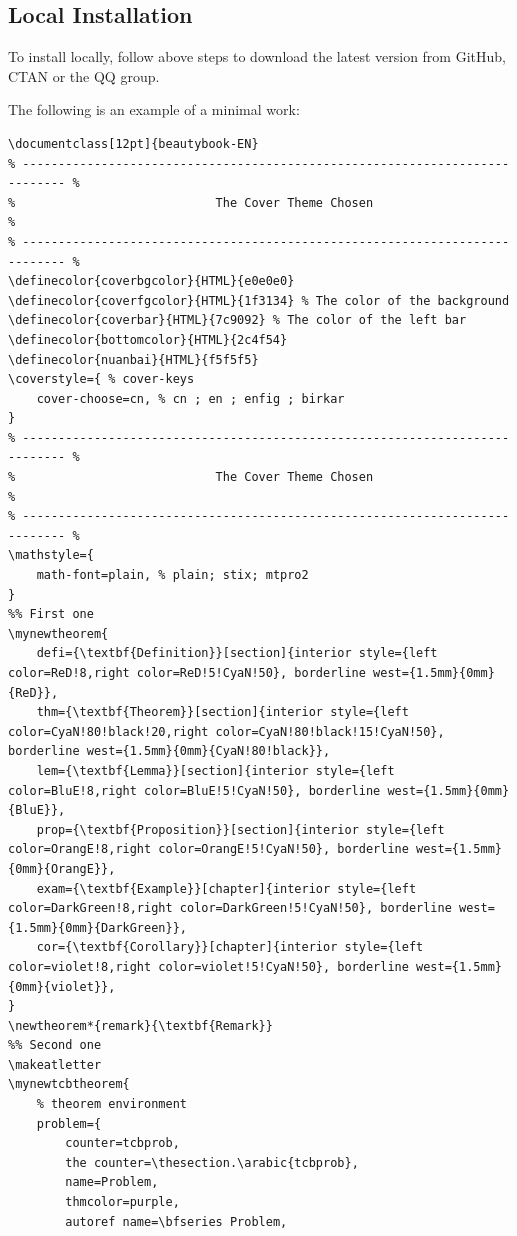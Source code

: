 \documentclass[lang=en,12pt]{beautybook}
\begin{document}
\subsection{Local Installation}

To install locally, follow above steps to download the latest version from GitHub, CTAN or the QQ group.

The following is an example of a minimal work:

\begin{lstlisting}
\documentclass[12pt]{beautybook-EN}
% ---------------------------------------------------------------------------- %
%                            The Cover Theme Chosen                            %
% ---------------------------------------------------------------------------- %
\definecolor{coverbgcolor}{HTML}{e0e0e0}
\definecolor{coverfgcolor}{HTML}{1f3134} % The color of the background
\definecolor{coverbar}{HTML}{7c9092} % The color of the left bar
\definecolor{bottomcolor}{HTML}{2c4f54}
\definecolor{nuanbai}{HTML}{f5f5f5}
\coverstyle={ % cover-keys
    cover-choose=cn, % cn ; en ; enfig ; birkar
}
% ---------------------------------------------------------------------------- %
%                            The Cover Theme Chosen                            %
% ---------------------------------------------------------------------------- %
\mathstyle={
    math-font=plain, % plain; stix; mtpro2 
}
%% First one
\mynewtheorem{
    defi={\textbf{Definition}}[section]{interior style={left color=ReD!8,right color=ReD!5!CyaN!50}, borderline west={1.5mm}{0mm}{ReD}},
    thm={\textbf{Theorem}}[section]{interior style={left color=CyaN!80!black!20,right color=CyaN!80!black!15!CyaN!50}, borderline west={1.5mm}{0mm}{CyaN!80!black}},
    lem={\textbf{Lemma}}[section]{interior style={left color=BluE!8,right color=BluE!5!CyaN!50}, borderline west={1.5mm}{0mm}{BluE}},
    prop={\textbf{Proposition}}[section]{interior style={left color=OrangE!8,right color=OrangE!5!CyaN!50}, borderline west={1.5mm}{0mm}{OrangE}},
    exam={\textbf{Example}}[chapter]{interior style={left color=DarkGreen!8,right color=DarkGreen!5!CyaN!50}, borderline west={1.5mm}{0mm}{DarkGreen}},
    cor={\textbf{Corollary}}[chapter]{interior style={left color=violet!8,right color=violet!5!CyaN!50}, borderline west={1.5mm}{0mm}{violet}},
}
\newtheorem*{remark}{\textbf{Remark}}
%% Second one
\makeatletter
\mynewtcbtheorem{
    % theorem environment
    problem={
        counter=tcbprob, 
        the counter=\thesection.\arabic{tcbprob}, 
        name=Problem, 
        thmcolor=purple,
        autoref name=\bfseries Problem, 

\end{lstlisting}
\end{document}
